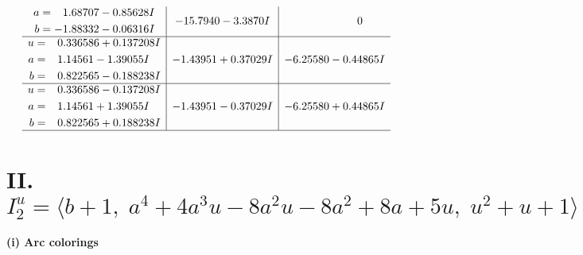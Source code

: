 \documentclass[1p]{elsarticle_modified}
\theoremstyle{definition}
\begin{document}
$$\begin{array}{c|c|c}
\begin{aligned}
a &= \phantom{-}1.68707 - 0.85628 I \\
b &= -1.88332 - 0.06316 I\end{aligned}
 & -15.7940 - 3.3870 I & \phantom{-0.000000 } 0 \\ \hline\begin{aligned}
u &= \phantom{-}0.336586 + 0.137208 I \\
a &= \phantom{-}1.14561 - 1.39055 I \\
b &= \phantom{-}0.822565 - 0.188238 I\end{aligned}
 & -1.43951 + 0.37029 I & -6.25580 - 0.44865 I \\ \hline\begin{aligned}
u &= \phantom{-}0.336586 - 0.137208 I \\
a &= \phantom{-}1.14561 + 1.39055 I \\
b &= \phantom{-}0.822565 + 0.188238 I\end{aligned}
 & -1.43951 - 0.37029 I & -6.25580 + 0.44865 I\\
 \hline 
 \end{array}$$\newpage\newpage\renewcommand{\arraystretch}{1}
\centering \section*{II. $I^u_{2}= \langle b+1,\;a^4+4 a^3 u-8 a^2 u-8 a^2+8 a+5 u,\;u^2+u+1 \rangle$}
\flushleft \textbf{(i) Arc colorings}\\
\end{document}
